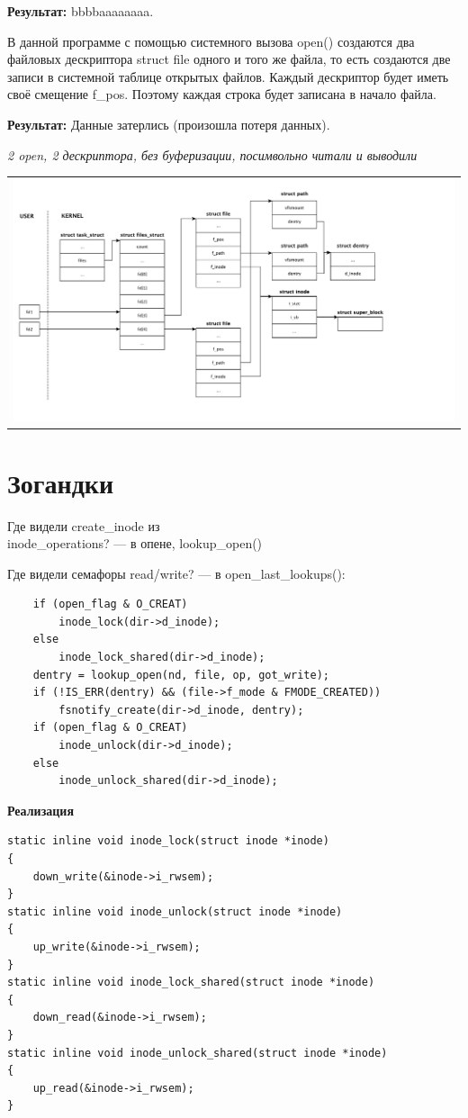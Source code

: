 \textbf{Результат:} bbbbaaaaaaaa.

В данной программе с помощью системного вызова open() создаются два файловых дескриптора struct file одного и того же файла, то есть создаются две записи в системной таблице открытых файлов. Каждый дескриптор будет иметь своё смещение f\_pos. Поэтому каждая строка будет записана в начало файла.

\textbf{Результат:} Данные затерлись (произошла потеря данных).

\textit{2 open, 2 дескриптора, без буферизации, посимвольно читали и выводили}
\begin{table}[H]
  \centering
  \begin{tabular}{p{1\linewidth}}
    \centering
    \includegraphics[width=0.8\linewidth]{./images/scheme2.pdf}
  \end{tabular}
\end{table}

\section*{Зогандки}

Где видели create\_inode из \\ inode\_operations? --- в опене, lookup\_open()

Где видели семафоры read/write? --- в open\_last\_lookups():

\begin{lstlisting}
	if (open_flag & O_CREAT)
		inode_lock(dir->d_inode);
	else
		inode_lock_shared(dir->d_inode);
	dentry = lookup_open(nd, file, op, got_write);
	if (!IS_ERR(dentry) && (file->f_mode & FMODE_CREATED))
		fsnotify_create(dir->d_inode, dentry);
	if (open_flag & O_CREAT)
		inode_unlock(dir->d_inode);
	else
		inode_unlock_shared(dir->d_inode);
\end{lstlisting}

\textbf{Реализация}

\begin{lstlisting}
static inline void inode_lock(struct inode *inode)
{
	down_write(&inode->i_rwsem);
}
static inline void inode_unlock(struct inode *inode)
{
	up_write(&inode->i_rwsem);
}
static inline void inode_lock_shared(struct inode *inode)
{
	down_read(&inode->i_rwsem);
}
static inline void inode_unlock_shared(struct inode *inode)
{
	up_read(&inode->i_rwsem);
}
\end{lstlisting}

